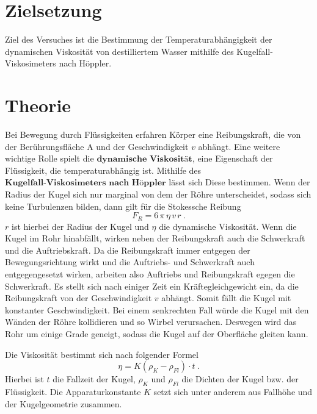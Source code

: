 \maketitle
\tableofcontents
\newpage

\section{Zielsetzung}
Ziel des Versuches ist die Bestimmung der Temperaturabhängigkeit der dynamischen
Viskosität von destilliertem Wasser mithilfe des Kugelfall-Viskosimeters nach Höppler.
\section{Theorie}
Bei Bewegung durch Flüssigkeiten erfahren Körper eine Reibungskraft, die von der
Berührungsfläche A und der Geschwindigkeit $v$ abhängt. Eine weitere wichtige Rolle
spielt die $\textbf{dynamische Viskosität}$, eine Eigenschaft der Flüssigkeit, die
temperaturabhängig ist. Mithilfe des $\textbf{Kugelfall-Viskosimeters nach Höppler}$
lässt sich Diese bestimmen. Wenn der Radius der Kugel sich nur marginal von dem
der Röhre unterscheidet, sodass sich keine Turbulenzen bilden, dann gilt für die
Stokessche Reibung
\begin{equation}
  F_R = 6 \, \pi \, \eta \, v \, r \ .
\end{equation}
$r$ ist hierbei der Radius der Kugel und $\eta$ die dynamische Viskosität.
Wenn die Kugel im Rohr hinabfällt, wirken neben der Reibungskraft auch die
Schwerkraft und die Auftriebskraft. Da die Reibungskraft immer entgegen
der Bewegungsrichtung wirkt und die Auftriebs- und Schwerkraft auch entgegengesetzt
wirken, arbeiten also Auftriebs und Reibungskraft egegen die Schwerkraft.
Es stellt sich nach einiger Zeit ein Kräftegleichgewicht ein, da die Reibungskraft
von der Geschwindigkeit $v$ abhängt. Somit fällt die Kugel mit konstanter Geschwindigkeit.
Bei einem senkrechten Fall würde die Kugel mit den Wänden der Röhre kollidieren und so
Wirbel verursachen. Deswegen wird das Rohr um einige Grade geneigt, sodass die Kugel
auf der Oberfläche gleiten kann.

Die Viskosität bestimmt sich nach folgender Formel
\begin{equation}
  \eta = K (\rho_K - \rho_{Fl}) \cdot t \ .
  \label{eqn:4}
\end{equation}
Hierbei ist $t$ die Fallzeit der Kugel, $\rho_K$ und $\rho_{Fl}$ die Dichten
der Kugel bzw. der Flüssigkeit. Die Apparaturkonstante $K$ setzt sich unter anderem
aus Fallhöhe und der Kugelgeometrie zusammen.

